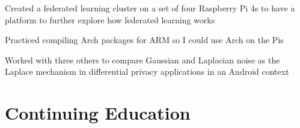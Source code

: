 \documentclass[letterpaper]{resume}
\begin{document}
\begin{compactitem}
\item Created a federated learning cluster on a set of four Raspberry Pi 4s to have a platform to further explore how federated learning works
\item Practiced compiling Arch packages for ARM so I could use Arch on the Pis
\end{compactitem}

\begin{compactitem}
\item Worked with three others to compare Gaussian and Laplacian noise as the Laplace mechanism in differential privacy applications in an Android context
\end{compactitem}


\section{Continuing Education}
\end{document}

